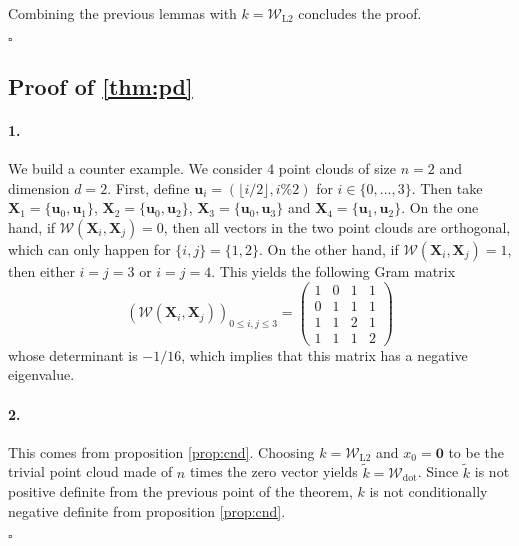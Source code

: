 \documentclass[letterpaper]{article} \usepackage{aaai22}  \usepackage{times}  \usepackage{helvet}  \usepackage{courier}  \usepackage[hyphens]{url}  \usepackage{graphicx} \urlstyle{rm} \def\UrlFont{\rm}  \usepackage{natbib}  \usepackage{caption} \DeclareCaptionStyle{ruled}{labelfont=normalfont,labelsep=colon,strut=off} \frenchspacing  \setlength{\pdfpagewidth}{8.5in}  \setlength{\pdfpageheight}{11in}  \usepackage{algorithm}
\newcommand{\uu}{{\mathbf u}}
\newcommand{\X}{{\mathbf X}}
\newcommand{\Was}{{\mathcal W}}
\begin{document}
Combining the previous lemmas with $k=\mathcal{W}_{\mathrm{L2}}$ concludes the proof. 
\begin{flushright}
$\square$
\end{flushright}




\subsection{Proof of \cref{thm:pd}}\label{sec:proof-pd}


\paragraph{1.} We build a counter example. We consider $4$ point clouds of size $n=2$ and dimension $d=2$. First, define $\uu_i = (\lfloor i/2\rfloor, i\%2)$ for $i\in\{0,...,3\}$. Then take $\X_1=\{\uu_0,\uu_1\}$, $\X_2=\{\uu_0,\uu_2\}$, $\X_3=\{\uu_0,\uu_3\}$ and $\X_4=\{\uu_1,\uu_2\}$.
On the one hand, if $\Was(\X_i, \X_j)=0$, then all vectors in the two point clouds are orthogonal, which can only happen for $\{i,j\}=\{1,2\}$. On the other hand, if $\Was(\X_i,\X_j)=1$, then either $i=j=3$ or $i=j=4$. This yields the following Gram matrix
\begin{equation}
(\Was(\X_i,\X_j))_{0\leq i,j\leq 3}=
\begin{pmatrix}
1 & 0 & 1 & 1 \\
0 & 1 & 1 & 1 \\
1 & 1 & 2 & 1 \\
1 & 1 & 1 & 2
\end{pmatrix}
\end{equation}
whose determinant is $-1/16$, which implies that this matrix has a negative eigenvalue.


\paragraph{2.} This comes from proposition \cref{prop:cnd}. Choosing $k=\Was_{\mathrm{L2}}$ and $x_0=\mathbf{0}$ to be the trivial point cloud made of $n$ times the zero vector yields $\tilde{k} = \Was_{\mathrm{dot}}$. Since $\tilde{k}$ is not positive definite from the previous point of the theorem, $k$ is not conditionally negative definite from proposition \cref{prop:cnd}.

\begin{flushright}
$\square$
\end{flushright}
\end{document}
